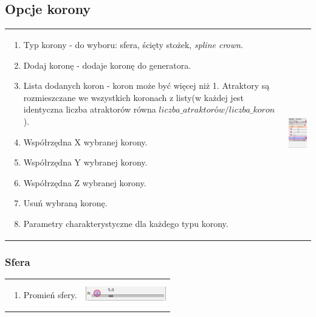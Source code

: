 \subsection{Opcje korony}
\begin{tabular}{lr}
\parbox[c]{95mm}{
\begin{enumerate}
	\item {Typ korony - do wyboru: sfera, ścięty stożek, \textit{spline crown}.}
	\item {Dodaj koronę - dodaje koronę do generatora.}	
	\item {Lista dodanych koron - koron może być więcej niż 1. Atraktory są rozmieszczane we wszystkich koronach z listy(w każdej jest identyczna liczba atraktorów równa $liczba\_atraktorów/liczba\_koron$).}
	\item {Współrzędna X wybranej korony.}
	\item {Współrzędna Y wybranej korony.}
	\item {Współrzędna Z wybranej korony.}
	\item {Usuń wybraną koronę.}
	\item {Parametry charakterystyczne dla każdego typu korony.}
\end{enumerate}
} &
\parbox[c]{35mm}{
\includegraphics[width=35mm]{images/gui/crown_panel.png}
}\\
\end{tabular}

\subsubsection{Sfera}
\begin{tabular}{lr}
\parbox[c]{95mm}{
\begin{enumerate}
	\item {Promień sfery.}
\end{enumerate}
} &
\parbox[c]{35mm}{
\includegraphics[width=35mm]{images/gui/sphere_crown.png}
}\\
\end{tabular}


